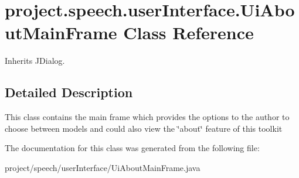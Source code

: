 \section{project.\+speech.\+user\+Interface.\+Ui\+About\+Main\+Frame Class Reference}
\label{classproject_1_1speech_1_1user_interface_1_1_ui_about_main_frame}


Inherits J\+Dialog.



\subsection{Detailed Description}
This class contains the main frame which provides the options to the author to choose between models and could also view the \char`\"{}about\char`\"{} feature of this toolkit 

The documentation for this class was generated from the following file\+:\begin{DoxyCompactItemize}
\item 
project/speech/user\+Interface/Ui\+About\+Main\+Frame.\+java\end{DoxyCompactItemize}
